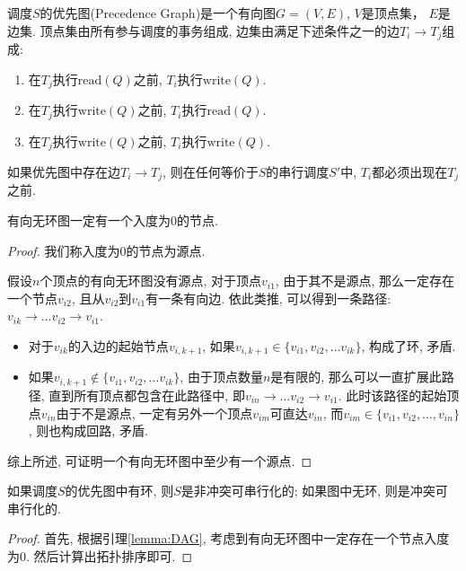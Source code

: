 \begin{definition}[优先图]
  调度$S$的优先图(Precedence Graph)是一个有向图$G=(V,E)$, $V$是顶点集，
  $E$是边集. 顶点集由所有参与调度的事务组成, 边集由满足下述条件之一的边$T_i\to T_j$组成:
  \begin{enumerate}
      \item 在$T_j$执行$\text{read}(Q)$之前, $T_i$执行$\text{write}(Q)$.
      \item 在$T_j$执行$\text{write}(Q)$之前, $T_i$执行$\text{read}(Q)$.
      \item 在$T_j$执行$\text{write}(Q)$之前, $T_i$执行$\text{write}(Q)$.
  \end{enumerate}
\end{definition}

\begin{theorem}
  如果优先图中存在边$T_i\to T_j$, 则在任何等价于$S$的串行调度$S'$中, $T_i$都必须出现在$T_j$之前.
\end{theorem}

\begin{lemma}\label{lemma:DAG}
  有向无环图一定有一个入度为0的节点.
\end{lemma}
\begin{proof}
  我们称入度为0的节点为源点.

  假设$n$个顶点的有向无环图没有源点, 对于顶点$v_{i1}$, 
  由于其不是源点, 那么一定存在一个节点$v_{i2}$, 
  且从$v_{i2}$到$v_{i1}$有一条有向边.
  依此类推, 可以得到一条路径: $v_{ik}\to \dots v_{i2}\to v_{i1}$.
  \begin{itemize}
    \item 对于$v_{ik}$的入边的起始节点$v_{i,k+1}$, 如果$v_{i,k+1}\in\{v_{i1}, v_{i2},\dots v_{ik}\}$, 构成了环, 矛盾.
    \item 如果$v_{i,k+1}\not\in\{v_{i1}, v_{i2},\dots v_{ik}\}$, 由于顶点数量$n$是有限的, 那么可以一直扩展此路径, 直到所有顶点都包含在此路径中, 即$v_{in}\to \dots v_{i2}\to v_{i1}$.
    此时该路径的起始顶点$v_{in}$由于不是源点, 一定有另外一个顶点$v_{im}$可直达$v_{in}$,
    而$v_{im}\in\{v_{i1},v_{i2},\dots,v_{in}\}$, 则也构成回路, 矛盾.
  \end{itemize}
  综上所述, 可证明一个有向无环图中至少有一个源点.
\end{proof}

\begin{theorem}
  如果调度$S$的优先图中有环, 则$S$是非冲突可串行化的;
  如果图中无环, 则是冲突可串行化的.
\end{theorem}

\begin{proof}
  首先, 根据引理\ref{lemma:DAG}, 考虑到有向无环图中一定存在一个节点入度为0. 然后计算出拓扑排序即可.
\end{proof}

